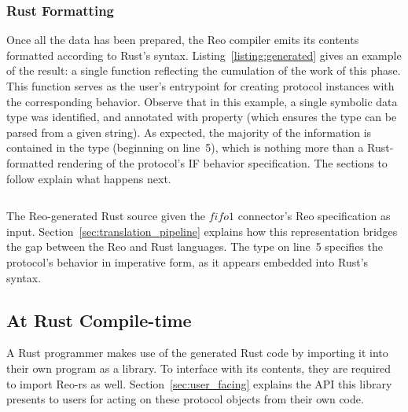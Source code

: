 \subsubsection{Rust Formatting}
Once all the data has been prepared, the Reo compiler emits its contents formatted according to Rust's syntax. Listing~\ref{listing:generated} gives an example of the result: a single  function reflecting the cumulation of the work of this phase. This function serves as the user's entrypoint for creating protocol instances with the corresponding behavior.
Observe that in this example, a single symbolic data type  was identified, and annotated with property  (which ensures the type can be parsed from a given string). As expected, the majority of the information is contained in the  type (beginning on line~5), which is nothing more than a Rust-formatted rendering of the protocol's IF behavior specification. The sections to follow explain what happens next.

\begin{listing}[ht]
	\centering
	\inputminted[]{rust}{generated.rs}
	\caption[TODO.]{The Reo-generated Rust source given the $fifo1$ connector's Reo specification as input. Section~\ref{sec:translation_pipeline} explains how this representation bridges the gap between the Reo and Rust languages. The  type on line~5 specifies the protocol's behavior in imperative form, as it appears embedded into Rust's syntax.}
	\label{listing:generated}
\end{listing}

\subsection{At Rust Compile-time}
A Rust programmer makes use of the generated Rust code by importing it into their own program as a library. To interface with its contents, they are required to import Reo-rs as well. Section~\ref{sec:user_facing} explains the API this library presents to users for acting on these protocol objects from their own code. 

